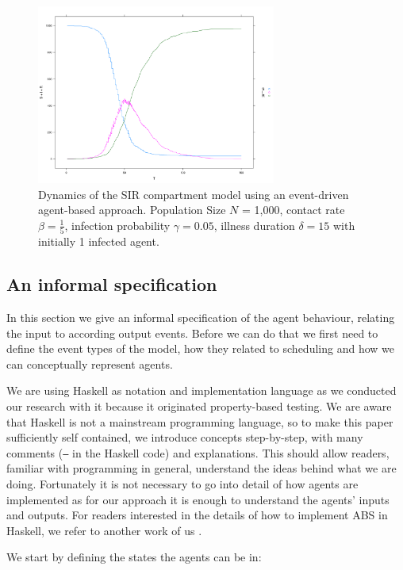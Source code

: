\begin{figure}
	\centering
	\includegraphics[width=0.7\textwidth, angle=0]{./fig2.png}
	\caption{Dynamics of the SIR compartment model using an event-driven agent-based approach. Population Size $N$ = 1,000, contact rate $\beta =  \frac{1}{5}$, infection probability $\gamma = 0.05$, illness duration $\delta = 15$ with initially 1 infected agent.}
	\label{fig:sir_sd_dynamics}
\end{figure}

\subsection{An informal specification}
In this section we give an informal specification of the agent behaviour, relating the input to according output events. Before we can do that we first need to define the event types of the model, how they related to scheduling and how we can conceptually represent agents.

We are using Haskell as notation and implementation language as we conducted our research with it because it originated property-based testing. We are aware that Haskell is not a mainstream programming language, so to make this paper sufficiently self contained, we introduce concepts step-by-step, with many comments (\texttt{--} in the Haskell code) and explanations. This should allow readers, familiar with programming in general, understand the ideas behind what we are doing. Fortunately it is not necessary to go into detail of how agents are implemented as for our approach it is enough to understand the agents' inputs and outputs. For readers interested in the details of how to implement ABS in Haskell, we refer to another work of us \cite{thaler_pure_2018}.

We start by defining the states the agents can be in:

